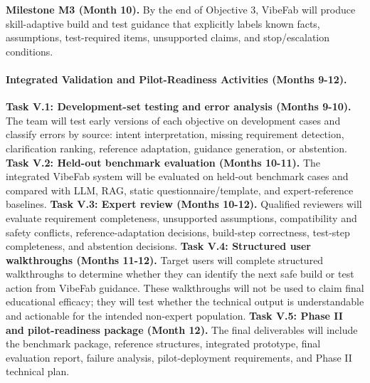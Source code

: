 \textbf{Milestone M3 (Month 10).}
By the end of Objective 3, VibeFab will produce skill-adaptive build and test guidance that explicitly labels known facts, assumptions, test-required items, unsupported claims, and stop/escalation conditions.

\vspace{-10pt}
\paragraph{Integrated Validation and Pilot-Readiness Activities (Months 9-12).}
\textbf{Task V.1: Development-set testing and error analysis (Months 9-10).}
The team will test early versions of each objective on development cases and classify errors by source: intent interpretation, missing requirement detection, clarification ranking, reference adaptation, guidance generation, or abstention.
\textbf{Task V.2: Held-out benchmark evaluation (Months 10-11).}
The integrated VibeFab system will be evaluated on held-out benchmark cases and compared with LLM, RAG, static questionnaire/template, and expert-reference baselines.
\textbf{Task V.3: Expert review (Months 10-12).}
Qualified reviewers will evaluate requirement completeness, unsupported assumptions, compatibility and safety conflicts, reference-adaptation decisions, build-step correctness, test-step completeness, and abstention decisions.
\textbf{Task V.4: Structured user walkthroughs (Months 11-12).}
Target users will complete structured walkthroughs to determine whether they can identify the next safe build or test action from VibeFab guidance. These walkthroughs will not be used to claim final educational efficacy; they will test whether the technical output is understandable and actionable for the intended non-expert population.
\textbf{Task V.5: Phase II and pilot-readiness package (Month 12).}
The final deliverables will include the benchmark package, reference structures, integrated prototype, final evaluation report, failure analysis, pilot-deployment requirements, and Phase II technical plan.

